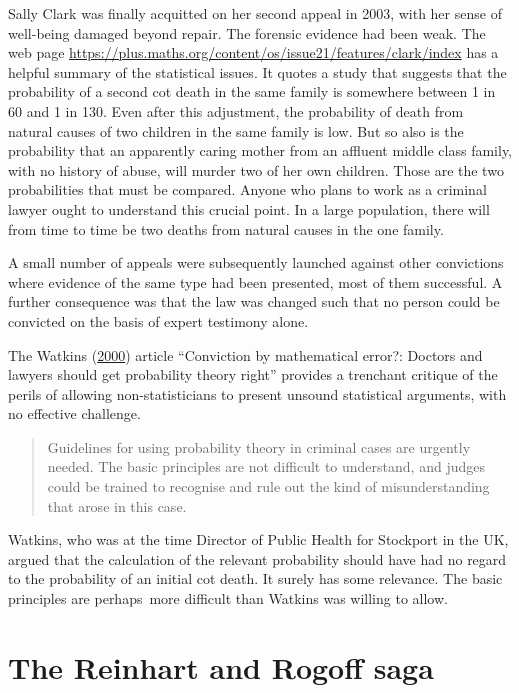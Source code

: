 \documentclass[
  10pt,
  b5paper]{book}
\begin{document}
Sally Clark was finally acquitted on her second appeal in
2003, with her sense of well-being damaged beyond repair.
The forensic evidence had been weak. The web page
\url{https://plus.maths.org/content/os/issue21/features/clark/index}
has a helpful summary of the statistical issues. It
quotes a study that suggests that the probability of a
second cot death in the same family is somewhere between 1
in 60 and 1 in 130. Even after this adjustment, the
probability of death from natural causes of two children in
the same family is low. But so also is the probability that
an apparently caring mother from an affluent middle class
family, with no history of abuse, will murder two of her own
children. Those are the two probabilities that must be
compared. Anyone who plans to work as a criminal lawyer
ought to understand this crucial point. In a
large population, there will from time to time be two deaths
from natural causes in the one family.

A small number of appeals were subsequently launched against
other convictions where evidence of the same type had been
presented, most of them successful. A further consequence
was that the law was changed such that no person could be
convicted on the basis of expert testimony alone.

The Watkins (\protect\hyperlink{ref-watkins2000conviction}{2000}) article ``Conviction by mathematical
error?: Doctors and lawyers should get probability theory right''
provides a trenchant critique of the perils of allowing
non-statisticians to present unsound statistical arguments, with
no effective challenge.

\begin{quote}
Guidelines for using probability theory in criminal cases are urgently needed. The basic principles are not difficult to understand, and judges could be trained to recognise and rule out the kind of misunderstanding that arose in this case.
\end{quote}

Watkins, who was at the time Director of Public Health for Stockport
in the UK, argued that the calculation of the relevant probability
should have had no regard to the probability of an initial cot death.
It surely has some relevance. The basic principles are perhaps~more
difficult than Watkins was willing to allow.

\hypertarget{the-reinhart-and-rogoff-saga}{%
\section{The Reinhart and Rogoff saga}\label{the-reinhart-and-rogoff-saga}}
\end{document}
